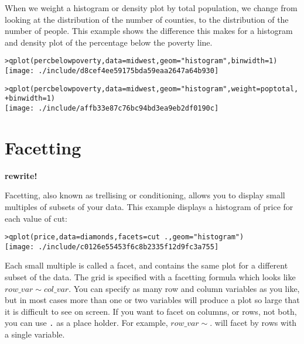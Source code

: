 When we weight a histogram or density plot by total population, we change from looking at the distribution of the number of counties, to the distribution of the number of people.  This example shows the difference this makes for a histogram and density plot of the percentage below the poverty line.

\begin{alltt}
> qplot(percbelowpoverty, data = midwest, geom = "histogram", binwidth = 1)
\texttt{[image: ./include/d8cef4ee59175bda59eaa2647a64b930]}

> qplot(percbelowpoverty, data = midwest, geom = "histogram", weight = poptotal, 
+     binwidth = 1)
\texttt{[image: ./include/affb33e87c76bc94bd3ea9eb2df0190c]}

\end{alltt}

\section{Facetting}\label{sec:facetting}

{\bf rewrite!}

Facetting, also known as trellising or conditioning, allows you to display small multiples of subsets of your data.  This example displays a histogram of price for each value of cut:

\begin{alltt}
> qplot(price, data = diamonds, facets = cut ~ ., geom = "histogram")
\texttt{[image: ./include/c0126e55453f6c8b2335f12d9fc3a755]}

\end{alltt}

Each small multiple is called a facet, and contains the same plot for a different subset of the data.  The grid is specified with a facetting formula which looks like $row\_var \sim col\_var $.  You can specify as many row and column variables as you like, but in most cases more than one or two variables will produce a plot so large that it is difficult to see on screen.  If you want to facet on columns, or rows, not both, you can use {\tt .} as a place holder.  For example, $row\_var \sim .$ will facet by rows with a single variable.  

